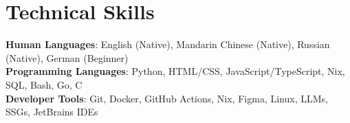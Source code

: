 \documentclass[letterpaper,11pt]{article}
\begin{document}
\section{Technical Skills}
 \begin{itemize}[leftmargin=0.15in, label={}]
    \small{\item{
     \textbf{Human Languages}{: English (Native), Mandarin Chinese (Native), Russian (Native), German (Beginner)} \\
     \textbf{Programming Languages}{: Python, HTML/CSS, JavaScript/TypeScript, Nix, SQL, Bash, Go, C} \\
     \textbf{Developer Tools}{: Git, Docker, GitHub Actions, Nix, Figma, Linux, LLMs, SSGs, JetBrains IDEs}
    }}
 \end{itemize}
\end{document}
